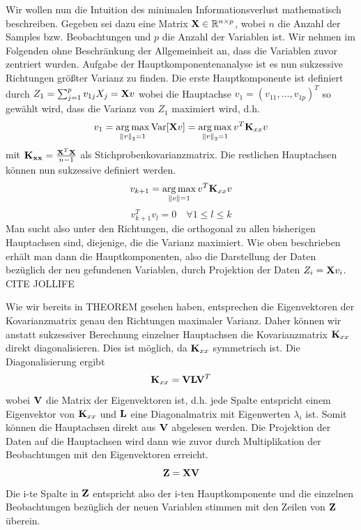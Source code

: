 Wir wollen nun die Intuition des minimalen Informationsverlust mathematisch beschreiben. Gegeben sei dazu eine Matrix $\mathbf{X} \in \mathbb{R}^{n\times p}$, wobei $n$ die Anzahl der Samples bzw. Beobachtungen und $p$ die Anzahl der Variablen ist. Wir nehmen im Folgenden ohne Beschränkung der Allgemeinheit an, dass die Variablen zuvor zentriert wurden. Aufgabe der Hauptkomponentenanalyse ist es nun sukzessive Richtungen größter Varianz zu finden. Die erste Hauptkomponente ist definiert durch $Z_1 = \sum_{j=1}^p v_{1j}X_j = \mathbf{X}v$ wobei die Hauptachse $v_1 = (v_{11}, \ldots, v_{1p})^T$ so gewählt wird, dass die Varianz von $Z_1$ maximiert wird, d.h.
$$v_1 = \operatorname*{arg\,max}_{\left\lVert v \right\rVert_2 = 1} \text{Var}[\mathbf{X}v] = \operatorname*{arg\,max}_{\left\lVert v \right\rVert_2 = 1} v^T \mathbf{K}_{xx} v$$
mit $\mathbf{K_{xx}} = \frac{\mathbf{X}^T\mathbf{X}}{n-1}$ als Stichprobenkovarianzmatrix. Die restlichen Hauptachsen können nun sukzessive definiert werden.
$$v_{k+1} = \operatorname*{arg\,max}_{\left\lVert v \right\rVert = 1} v^T \mathbf{K}_{xx} v$$ 
$$v_{k+1}^Tv_l = 0 \quad \forall 1 \leq l \leq k$$
Man sucht also unter den Richtungen, die orthogonal zu allen bisherigen Hauptachsen sind, diejenige, die die Varianz maximiert. Wie oben beschrieben erhält man dann die Hauptkomponenten, also die Darstellung der Daten bezüglich der neu gefundenen Variablen, durch Projektion der Daten $Z_i = \mathbf{X}v_i$.
\cite{zou_overview}
CITE JOLLIFE

Wie wir bereits in THEOREM gesehen haben, entsprechen die Eigenvektoren der Kovarianzmatrix genau den Richtungen maximaler Varianz. Daher können wir anstatt sukzessiver Berechnung einzelner Hauptachsen die Kovarianzmatrix $\mathbf{K}_{xx}$ direkt diagonalisieren. Dies ist möglich, da $\mathbf{K}_{xx}$ symmetrisch ist. Die Diagonalisierung ergibt
$$\mathbf{K}_{xx} = \mathbf{V} \mathbf{L} \mathbf{V}^T$$
wobei $\mathbf{V}$ die Matrix der Eigenvektoren ist, d.h. jede Spalte entspricht einem Eigenvektor von $\mathbf{K}_{xx}$ und $\mathbf{L}$ eine Diagonalmatrix mit Eigenwerten $\lambda_i$ ist. Somit können die Hauptachsen direkt aus $\mathbf{V}$ abgelesen werden. Die Projektion der Daten auf die Hauptachsen wird dann wie zuvor durch Multiplikation der Beobachtungen mit den Eigenvektoren erreicht. 
$$\mathbf{Z} = \mathbf{X} \mathbf{V}$$
Die i-te Spalte in $\mathbf{Z}$ entspricht also der i-ten Hauptkomponente und die einzelnen Beobachtungen bezüglich der neuen Variablen stimmen mit den Zeilen von $\mathbf{Z}$ überein.


